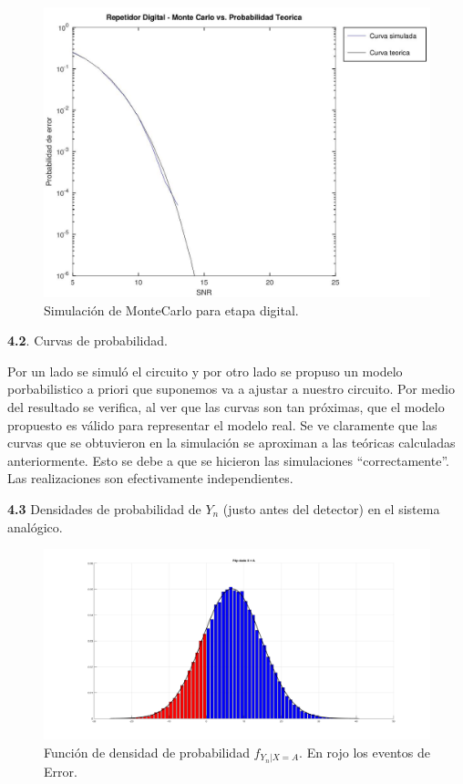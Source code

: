 \begin{figure}[H]
  \centering
  \includegraphics[width=1\textwidth]{images/Pe_pto4_2}
  \caption{Simulación de MonteCarlo para etapa digital.}
  \label{fig:pto4_2}
\end{figure}


\textbf{4.2}. Curvas de probabilidad.

Por un lado se simuló el circuito y por otro lado se propuso un modelo porbabilistico a priori que suponemos va a ajustar a nuestro circuito.
Por medio del resultado se verifica, al ver que las curvas son tan próximas, que el modelo propuesto es válido para representar el modelo real.
Se ve claramente que las curvas que se obtuvieron en la simulación se aproximan a las teóricas calculadas anteriormente. Esto se debe a que se hicieron las simulaciones ``correctamente''. Las realizaciones son efectivamente independientes. 

\newpage

\textbf{4.3} Densidades de probabilidad de $Y_n$ (justo antes del detector) en el sistema analógico.

\begin{figure}[H]
  \centering
  \includegraphics[width=1\textwidth]{images/fdp_XA}
  \caption{Función de densidad de probabilidad $f_{Y_n|X=A}$. En rojo los eventos de Error.}
  \label{fig:pto4_3}
\end{figure}	

